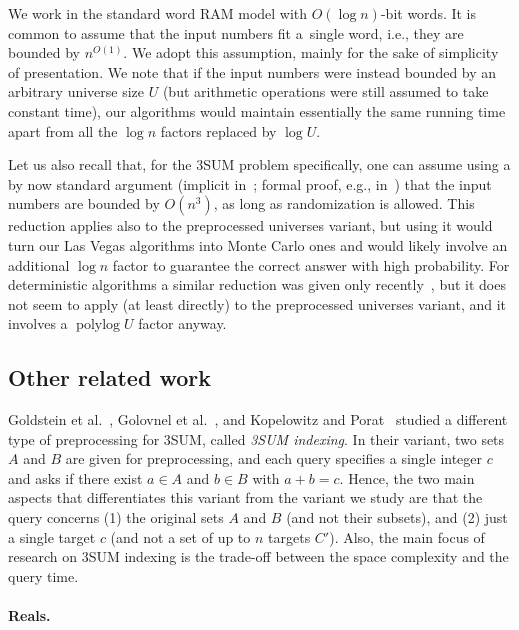 \documentclass[10pt,a4paper]{article}
\begin{document}
We work in the standard word RAM model with $O(\log n)$-bit words. It is common to assume that the input numbers fit a~single word, i.e., they are bounded by $n^{O(1)}$. We adopt this assumption, mainly for the sake of simplicity of presentation. We note that if the input numbers were instead bounded by an arbitrary universe size $U$ (but arithmetic operations were still assumed to take constant time), our algorithms would maintain essentially the same running time apart from all the $\log n$ factors replaced by $\log U$.

Let us also recall that, for the 3SUM problem specifically, one can assume using a by now standard argument (implicit in~\cite{BaranDP08}; formal proof, e.g., in~\cite[Lemma B.1]{AbboudLW14}) that the input numbers are bounded by $O(n^3)$, as long as randomization is allowed. This reduction applies also to the preprocessed universes variant, but using it would turn our Las Vegas algorithms into Monte Carlo ones and would likely involve an additional $\log n$ factor to guarantee the correct answer with high probability. For deterministic algorithms a similar reduction was given only recently~\cite{FischerK024}, but it does not seem to apply (at least directly) to the preprocessed universes variant, and it involves a $\operatorname{polylog} U$ factor anyway.

\subsection{Other related work}

Goldstein et al.~\cite{GoldsteinKLP17}, Golovnel et al.~\cite{GolovnevGHPV20}, and Kopelowitz and Porat~\cite{KopelowitzP19} studied a different type of preprocessing for 3SUM, called \emph{3SUM indexing}. In their variant, two sets $A$ and $B$ are given for preprocessing, and each query specifies a single integer $c$ and asks if there exist $a \in A$ and $b \in B$ with $a+b=c$. 
Hence, the two main aspects that differentiates this variant from the variant we study are that the query concerns (1) the original sets $A$ and $B$ (and not their subsets), and (2) just a single target $c$ (and not a set of up to $n$ targets $C'$). Also, the main focus of research on 3SUM indexing is the trade-off between the space complexity and the query time.

\paragraph{Reals.}
\end{document}
